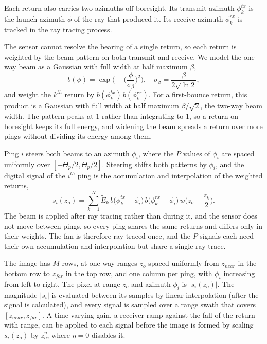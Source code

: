 \documentclass[sensors,article,submit,moreauthors]{Definitions/mdpi}
\begin{document}
Each return also carries two azimuths off boresight. Its transmit azimuth
$\phi^{tx}_k$ is the
launch azimuth $\phi$ of the ray that produced it. Its receive azimuth
$\phi^{rx}_k$ is tracked
in the ray tracing process.

The sensor cannot resolve the bearing of a single return, so each return is
weighted by the beam
pattern on both transmit and receive. We model the one-way beam as a Gaussian
with full width at
half maximum $\beta$,
\begin{equation}
    b(\phi) = \exp\Bigg(-\bigg(\frac{\phi}{\sigma_{\beta}}\bigg)^2\Bigg)
    , \quad
    \sigma_\beta = \frac{\beta}{2\sqrt{\ln 2}}
    ,
    \label{eq:beam-pattern}
\end{equation}
and weight the $k^{th}$ return by $b(\phi^{tx}_k)\,b(\phi^{rx}_k)$. For a
first-bounce return, this
product is a Gaussian with full width at half maximum $\beta/\sqrt{2}$, the
two-way beam width. The pattern
peaks at $1$ rather than integrating to $1$, so a return on boresight keeps its
full energy, and
widening the beam spreads a return over more pings without dividing its energy
among them.

Ping $i$ steers both beams to an azimuth $\phi_i$, where the $P$ values of
$\phi_i$ are spaced
uniformly over $[-\Theta_p/2,\Theta_p/2]$. Steering shifts both patterns by
$\phi_i$, and the
digital signal of the $i^{th}$ ping is the accumulation and interpolation of the
weighted returns,
\begin{equation}
    s_i(z_o) =
    \sum_{k=1}^{N}\tilde{E}_k\,b\big(\phi^{tx}_k-\phi_i\big)\,b\big(\phi^{rx}%
    _k-\phi_i\big)\,w\bigg(z_o-\frac{z_k}{2}\bigg)
    .
    \label{eq:fls-signal}
\end{equation}
The beam is applied after ray
tracing rather than during it, and the sensor does not move between pings, so
every ping shares
the same returns and differs only in their weights. The fan is therefore ray
traced once, and the
$P$ signals each need their own accumulation and interpolation but share a
single ray trace.

The image has $M$ rows, at one-way ranges $z_o$ spaced uniformly from $z_{near}$
in the
bottom row to $z_{far}$ in the top row, and one column per ping, with $\phi_i$
increasing from
left to right. The pixel at range $z_o$ and azimuth $\phi_i$ is $|s_i(z_o)|$.
The magnitude $|s_i|$ is evaluated between its samples by linear interpolation (after the
signal
is calculated), and every signal is sampled over a range swath that covers 
$[z_{near},z_{far}]$. A time-varying gain, a receiver ramp
against the fall of the return with range, can be applied to each signal before
the image is
formed by scaling $s_i(z_o)$ by $z_o^{\eta}$, where $\eta = 0$ disables it.
\end{document}

